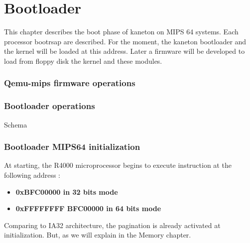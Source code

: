 %
%
%
%
%
%

%
%

\chapter{Bootloader}

This chapter describes the boot phase of kaneton on MIPS 64 systems. Each processor bootrsap are described. For the moment, the kaneton bootloader and the kernel will be loaded at this address. Later a firmware will be developed to load from floppy disk the kernel and these modules.

\subsection{Qemu-mips firmware operations}

\subsection{Bootloader operations}

Schema

\subsection{Bootloader MIPS64 initialization}

At starting, the R4000 microprocessor begins to execute instruction at the following address :

\begin{itemize}
  \item
    \textbf{0xBFC00000 in 32 bits mode}
  \item
    \textbf{0xFFFFFFFF BFC00000 in 64 bits mode}
\end{itemize}

Comparing to IA32 architecture, the pagination is already activated at initialization. But, as we will explain in the Memory chapter.

